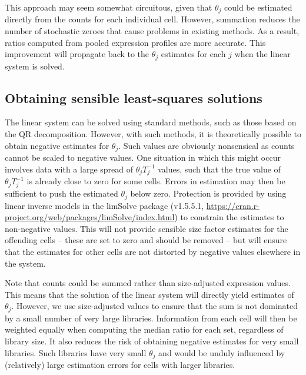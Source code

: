 \documentclass{article}
\begin{document}
This approach may seem somewhat circuitous, given that $\theta_j$ could be estimated directly from the counts for each individual cell.
However, summation reduces the number of stochastic zeroes that cause problems in existing methods.
As a result, ratios computed from pooled expression profiles are more accurate.
This improvement will propagate back to the $\theta_j$ estimates for each $j$ when the linear system is solved.

\subsection{Obtaining sensible least-squares solutions}
The linear system can be solved using standard methods, such as those based on the QR decomposition.
However, with such methods, it is theoretically possible to obtain negative estimates for $\theta_j$.
Such values are obviously nonsensical as counts cannot be scaled to negative values.
One situation in which this might occur involves data with a large spread of $\theta_jT_j^{-1}$ values, 
    such that the true value of $\theta_jT_j^{-1}$ is already close to zero for some cells.
Errors in estimation may then be sufficient to push the estimated $\theta_j$ below zero.
Protection is provided by using linear inverse models in the limSolve package (v1.5.5.1, \url{https://cran.r-project.org/web/packages/limSolve/index.html}) to constrain the estimates to non-negative values.
This will not provide sensible size factor estimates for the offending cells -- these are set to zero and should be removed --
    but will ensure that the estimates for other cells are not distorted by negative values elsewhere in the system.

Note that counts could be summed rather than size-adjusted expression values.
This means that the solution of the linear system will directly yield estimates of $\theta_j$.
However, we use size-adjusted values to ensure that the sum is not dominated by a small number of very large libraries.
Information from each cell will then be weighted equally when computing the median ratio for each set, regardless of library size.
It also reduces the risk of obtaining negative estimates for very small libraries.
Such libraries have very small $\theta_j$ and would be unduly influenced by (relatively) large estimation errors for cells with larger libraries.
\end{document}
